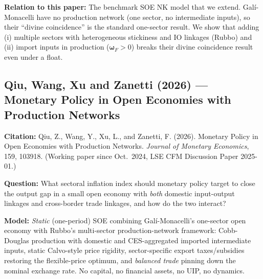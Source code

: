 \documentclass[12pt]{article}
\begin{document}
\textbf{Relation to this paper:} The benchmark SOE NK model that we extend. Galí-Monacelli have no production network (one sector, no intermediate inputs), so their ``divine coincidence'' is the standard one-sector result. We show that adding (i) multiple sectors with heterogeneous stickiness and IO linkages (Rubbo) and (ii) import inputs in production ($\bm{\omega}_F > 0$) breaks their divine coincidence result even under a float.

\subsection{Qiu, Wang, Xu and Zanetti (2026) --- Monetary Policy in Open Economies with Production Networks}
\label{lit:qwxz}

\textbf{Citation:} Qiu, Z., Wang, Y., Xu, L., and Zanetti, F. (2026). Monetary Policy in Open Economies with Production Networks. \textit{Journal of Monetary Economics}, 159, 103918. (Working paper since Oct.\ 2024, LSE CFM Discussion Paper 2025-01.)

\textbf{Question:} What sectoral inflation index should monetary policy target to close the output gap in a small open economy with \emph{both} domestic input-output linkages and cross-border trade linkages, and how do the two interact?

\textbf{Model:} \emph{Static} (one-period) SOE combining Galí-Monacelli's one-sector open economy with Rubbo's multi-sector production-network framework: Cobb-Douglas production with domestic and CES-aggregated imported intermediate inputs, static Calvo-style price rigidity, sector-specific export taxes/subsidies restoring the flexible-price optimum, and \emph{balanced trade} pinning down the nominal exchange rate. No capital, no financial assets, no UIP, no dynamics.
\end{document}
